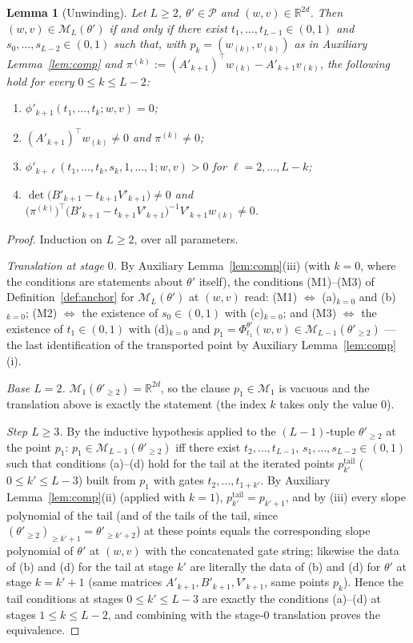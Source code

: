 \documentclass[11pt]{article}
\newtheorem{lemma}[theorem]{Lemma}
\theoremstyle{definition}
\theoremstyle{remark}
\theoremstyle{plain}
\newcommand{\R}{\mathbb{R}}
\newcommand{\cP}{\mathcal{P}}
\newcommand{\cM}{\mathcal{M}}
\begin{document}
\begin{lemma}[Unwinding]\label{lem:unwind}
Let $L\ge2$, $\theta'\in\cP$ and $(w,v)\in\R^{2d}$.  Then $(w,v)\in\cM_L(\theta')$ if
and only if there exist $t_1,\dots,t_{L-1}\in(0,1)$ and
$s_0,\dots,s_{L-2}\in(0,1)$ such that, with
$p_k=(w_{(k)},v_{(k)})$ as in Auxiliary Lemma~\ref{lem:comp} and
$\pi^{(k)}:=(A'_{k+1})^\top w_{(k)}-A'_{k+1}v_{(k)}$, the following hold for every
$0\le k\le L-2$:
\begin{enumerate}
\item[(a)] $\phi'_{k+1}(t_1,\dots,t_k;w,v)=0$;
\item[(b)] $(A'_{k+1})^\top w_{(k)}\neq0$ and $\pi^{(k)}\neq0$;
\item[(c)] $\phi'_{k+\ell}(t_1,\dots,t_k,s_k,1,\dots,1;w,v)>0$ for
$\ell=2,\dots,L-k$;
\item[(d)] $\det\big(B'_{k+1}-t_{k+1}V'_{k+1}\big)\neq0$ and
$\big(\pi^{(k)}\big)^\top\big(B'_{k+1}-t_{k+1}V'_{k+1}\big)^{-1}V'_{k+1}w_{(k)}\neq0$.
\end{enumerate}
\end{lemma}

\begin{proof}
Induction on $L\ge2$, over all parameters.

\emph{Translation at stage $0$.}  By Auxiliary Lemma~\ref{lem:comp}(iii) (with $k=0$,
where the conditions are statements about $\theta'$ itself), the conditions
(M1)--(M3) of Definition~\ref{def:anchor} for $\cM_L(\theta')$ at $(w,v)$ read:
(M1) $\Leftrightarrow$ (a)$_{k=0}$ and (b)$_{k=0}$; (M2) $\Leftrightarrow$ the
existence of $s_0\in(0,1)$ with (c)$_{k=0}$; and (M3) $\Leftrightarrow$ the existence
of $t_1\in(0,1)$ with (d)$_{k=0}$ and
$p_1=\Phi^{\theta'}_{t_1}(w,v)\in\cM_{L-1}(\theta'_{\ge2})$ --- the last identification
of the transported point by Auxiliary Lemma~\ref{lem:comp}(i).

\emph{Base $L=2$.}  $\cM_1(\theta'_{\ge2})=\R^{2d}$, so the clause
$p_1\in\cM_1$ is vacuous and the translation above is exactly the statement (the index
$k$ takes only the value $0$).

\emph{Step $L\ge3$.}  By the inductive hypothesis applied to the $(L-1)$-tuple
$\theta'_{\ge2}$ at the point $p_1$: $p_1\in\cM_{L-1}(\theta'_{\ge2})$ iff there exist
$t_2,\dots,t_{L-1},\,s_1,\dots,s_{L-2}\in(0,1)$ such that conditions (a)--(d) hold for
the tail at the iterated points
$p^{\mathrm{tail}}_{k'}$ ($0\le k'\le L-3$) built from $p_1$ with gates
$t_2,\dots,t_{1+k'}$.  By Auxiliary Lemma~\ref{lem:comp}(ii) (applied with $k=1$),
$p^{\mathrm{tail}}_{k'}=p_{k'+1}$, and by (iii) every slope polynomial of the tail (and
of the tails of the tail, since
$(\theta'_{\ge2})_{\ge k'+1}=\theta'_{\ge k'+2}$) at these points equals the
corresponding slope polynomial of $\theta'$ at $(w,v)$ with the concatenated gate
string; likewise the data of (b) and (d) for the tail at stage $k'$ are literally the
data of (b) and (d) for $\theta'$ at stage $k=k'+1$ (same matrices
$A'_{k+1},B'_{k+1},V'_{k+1}$, same points $p_k$).  Hence the tail conditions at stages
$0\le k'\le L-3$ are exactly the conditions (a)--(d) at stages $1\le k\le L-2$, and
combining with the stage-$0$ translation proves the equivalence.
\end{proof}
\end{document}
